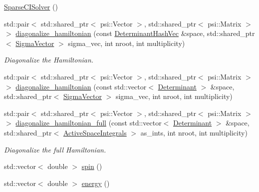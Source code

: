 \begin{DoxyCompactItemize}
\item 
\mbox{\hyperlink{classforte_1_1_sparse_c_i_solver_a3d92d7bc72cd7959d9095740446ad4f5}{Sparse\+C\+I\+Solver}} ()
\item 
std\+::pair$<$ std\+::shared\+\_\+ptr$<$ psi\+::\+Vector $>$, std\+::shared\+\_\+ptr$<$ psi\+::\+Matrix $>$ $>$ \mbox{\hyperlink{classforte_1_1_sparse_c_i_solver_aa81ea670ca5f9c488283df101c0a9e15}{diagonalize\+\_\+hamiltonian}} (const \mbox{\hyperlink{classforte_1_1_determinant_hash_vec}{Determinant\+Hash\+Vec}} \&space, std\+::shared\+\_\+ptr$<$ \mbox{\hyperlink{classforte_1_1_sigma_vector}{Sigma\+Vector}} $>$ sigma\+\_\+vec, int nroot, int multiplicity)
\begin{DoxyCompactList}\small\item\em Diagonalize the Hamiltonian. \end{DoxyCompactList}\item 
std\+::pair$<$ std\+::shared\+\_\+ptr$<$ psi\+::\+Vector $>$, std\+::shared\+\_\+ptr$<$ psi\+::\+Matrix $>$ $>$ \mbox{\hyperlink{classforte_1_1_sparse_c_i_solver_a6de972e8f7fafb70951db94bf5cd89bc}{diagonalize\+\_\+hamiltonian}} (const std\+::vector$<$ \mbox{\hyperlink{namespaceforte_a2076c63fd7b8732004d9e1442ce527c1}{Determinant}} $>$ \&space, std\+::shared\+\_\+ptr$<$ \mbox{\hyperlink{classforte_1_1_sigma_vector}{Sigma\+Vector}} $>$ sigma\+\_\+vec, int nroot, int multiplicity)
\item 
std\+::pair$<$ std\+::shared\+\_\+ptr$<$ psi\+::\+Vector $>$, std\+::shared\+\_\+ptr$<$ psi\+::\+Matrix $>$ $>$ \mbox{\hyperlink{classforte_1_1_sparse_c_i_solver_a0914242905e0c2483757b4b8ff213c41}{diagonalize\+\_\+hamiltonian\+\_\+full}} (const std\+::vector$<$ \mbox{\hyperlink{namespaceforte_a2076c63fd7b8732004d9e1442ce527c1}{Determinant}} $>$ \&space, std\+::shared\+\_\+ptr$<$ \mbox{\hyperlink{classforte_1_1_active_space_integrals}{Active\+Space\+Integrals}} $>$ as\+\_\+ints, int nroot, int multiplicity)
\begin{DoxyCompactList}\small\item\em Diagonalize the full Hamiltonian. \end{DoxyCompactList}\item 
std\+::vector$<$ double $>$ \mbox{\hyperlink{classforte_1_1_sparse_c_i_solver_abf0bf012929ae40717c84464804960bc}{spin}} ()
\item 
std\+::vector$<$ double $>$ \mbox{\hyperlink{classforte_1_1_sparse_c_i_solver_af6b2886d5631f37463a8e9e903f19d40}{energy}} ()
\item 

\end{DoxyCompactItemize}
